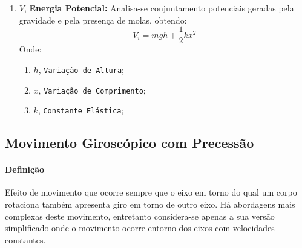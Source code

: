 \documentclass{article}
\begin{document}
\begin{enumerate}[rightmargin = \leftmargin]
                    \item $V$, \textbf{Energia Potencial:} Analisa-se conjuntamento potenciais geradas pela gravidade e pela presença de molas, obtendo:
                        \begin{equation}
                            \boxed{
                                V_{i} = 
                                m g h +
                                \frac{1}{2} k x^{2} 
                            }
                        \end{equation}
                    Onde:
                        \begin{enumerate}[rightmargin = \leftmargin, noitemsep]
                            \item $h$, \texttt{Variação de Altura};
                            \item $x$, \texttt{Variação de Comprimento};
                            \item $k$, \texttt{Constante Elástica};
                        \end{enumerate}
                \end{enumerate}
\newpage

        \subsection{Movimento Giroscópico com Precessão}
            \paragraph{Definição}Efeito de movimento que ocorre sempre que o eixo em torno do qual um corpo rotaciona também apresenta giro em torno de outro eixo. Há abordagens mais complexas deste movimento, entretanto considera-se apenas a sua versão simplificado onde o movimento ocorre entorno dos eixos com velocidades constantes.
\end{document}
